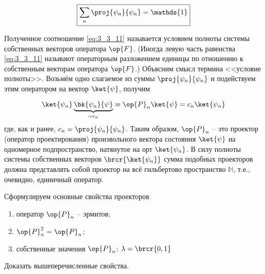 \begin{equation}
\label{eq:3_3_11}
\boxed {
	\sum_n \proj{\psi_n}{\psi_n} = \mathds{1}
}
\end{equation}

Полученное соотношение \eqref{eq:3_3_11} называется условием полноты системы собственных векторов оператора $\op{F}$. (Иногда левую часть равенства \eqref{eq:3_3_11} называют операторным разложением единицы по отношению к собственным векторам оператора $\op{F}$.) Объясним смысл термина <<условие полноты>>. Возьмём одно слагаемое из суммы $\proj{\psi_n}{\psi_n}$ и подействуем этим оператором на вектор $\ket{\psi}$, получим

\begin{equation}
\label{eq:3_3_12}
\ket{\psi_n} \underbrace{\bk{\psi_n}{\psi}}_{ = c_n} \equiv
  \op{P}_n \ket{\psi} = c_n \ket{\psi_n}
\end{equation}%
%
где, как и ранее, $c_n = \proj{\psi_n}{\psi_n}$. Таким образом, $\op{P}_n$ -- это проектор (оператор проектирования) произвольного вектора состояния $\ket{\psi}$ на одномерное подпространство, натянутое на орт $\ket{\psi_n}$. В силу полноты системы собственных векторов $\brcr{\ket{\psi_n}}$ сумма подобных проекторов должна представлять собой проектор на всё гильбертово пространство $\mathbb{H}$, т.е., очевидно, единичный оператор.

Сформулируем основные свойства проекторов

\begin{enumerate}
\item оператор $\op{P}_n$ -- эрмитов;
\item $\op{P}_n^2 = \op{P}_n$; \footnotemark{}
\item собственные значения $\op{P}_n$: $\lambda = \brcr{0, 1}$
\end{enumerate}

\begin{excr}
Доказать вышеперечисленные свойства.
\end{excr}


